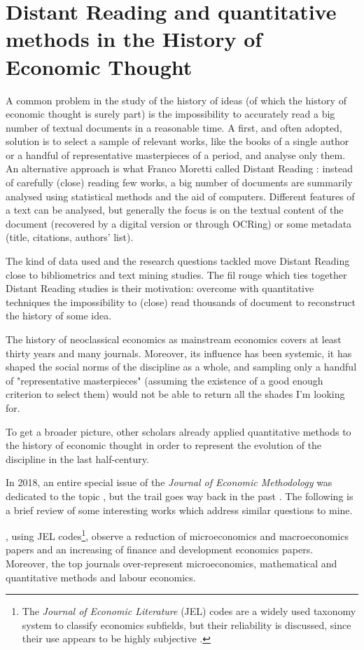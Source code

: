 \documentclass[a4paper, 11pt, headings=standardclasses, tablecaptionsbelow]{scrartcl}
\begin{document}
\section{Distant Reading and quantitative methods in the History of Economic Thought}
A common problem in the study of the history of ideas (of which the history of economic thought is surely part) is the impossibility to accurately read a big number of textual documents in a reasonable time. A first, and often adopted, solution is to select a sample of relevant works, like the books of a single author or a handful of representative masterpieces of a period, and analyse only them.
An alternative approach is what Franco Moretti called Distant Reading \parencite{moretti2013}: instead of carefully (close) reading few works, a big number of documents are summarily analysed using statistical methods and the aid of computers.
Different features of a text can be analysed, but generally the focus is on the textual content of the document (recovered by a digital version or through OCRing) or some metadata (title, citations, authors' list).

The kind of data used and the research questions tackled move Distant Reading close to bibliometrics and text mining studies. The fil rouge which ties together Distant Reading studies is their motivation: overcome with quantitative techniques the impossibility to (close) read thousands of document to reconstruct the history of some idea.

The history of neoclassical economics as mainstream economics covers at least thirty years and many journals. Moreover, its influence has been systemic, it has shaped the social norms of the discipline as a whole, and sampling only a handful of "representative masterpieces" (assuming the existence of a good enough criterion to select them) would not be able to return all the shades I'm looking for.

To get a broader picture, other scholars already applied quantitative methods to the history of economic thought in order to represent the evolution of the discipline in the last half-century.

In 2018, an entire special issue of the \textit{Journal of Economic Methodology} was dedicated to the topic \parencite{edwards2018a,cherrier2018a}, but the trail goes way back in the past \parencite{backhouse1997}.
The following is a brief review of some interesting works which address similar questions to mine.

\textcite{kelly2011}, using JEL codes\footnote{The \textit{Journal of Economic Literature} (JEL) codes are a widely used taxonomy system to classify economics subfields, but their reliability is discussed, since their use appears to be highly subjective \parencite{cherrier2017,kosnik2018}.}, observe a reduction of microeconomics and macroeconomics papers and an increasing of finance and development economics papers.
Moreover, the top journals over-represent microeconomics, mathematical and quantitative methods and labour economics.
\end{document}

